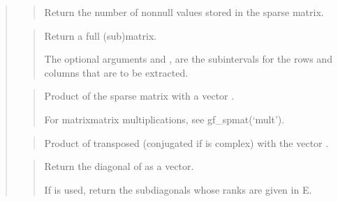 \documentclass[a4paper,11pt,english]{sphinxmanual}
\begin{document}
\begin{quote}

\begin{quote}

Return the number of non\sphinxhyphen{}null values stored in the sparse matrix.
\end{quote}

\begin{quote}

Return a full (sub\sphinxhyphen{})matrix.

The optional arguments  and , are the sub\sphinxhyphen{}intervals for the
rows and columns that are to be extracted.
\end{quote}

\begin{quote}

Product of the sparse matrix  with a vector .

For matrix\sphinxhyphen{}matrix multiplications, see gf\_spmat(‘mult’).
\end{quote}

\begin{quote}

Product of  transposed (conjugated if  is complex) with the
vector .
\end{quote}

\begin{quote}

Return the diagonal of  as a vector.

If  is used, return the sub\sphinxhyphen{}diagonals whose ranks are given in E.
\end{quote}

\begin{quote}


\end{quote}
\end{quote}
\end{document}
